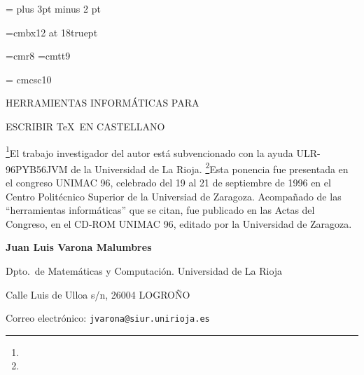 



\magnification=
\frenchspacing %
\parskip=4pt plus 3pt minus 2 pt %


\font\titulobf=cmbx12 at 18truept

\font\eightrm=cmr8
\font\eighttt=cmtt9

\font\sc = cmcsc10

\def\LaTeX{{\rm L\kern-.36em\raise.3ex\hbox{\sc a}\kern-.15em
    T\kern-.1667em\lower.7ex\hbox{E}\kern-.125emX}}



\centerline{\titulobf HERRAMIENTAS INFORM\'ATICAS PARA}
\medskip
\centerline{\titulobf ESCRIBIR \TeX\ EN CASTELLANO}
\footnote{}{{\sevenrm El trabajo investigador del autor est\'a
subvencionado con la ayuda ULR-96PYB56JVM de la Universidad de La Rioja.}}
\footnote{}{{\sevenrm Esta ponencia fue presentada en el congreso
UNIMAC 96, celebrado del 19 al 21 de septiembre de 1996 en el
Centro Polit\'ecnico Superior de la Universiad de Zaragoza.
Acompa\~nado de las ``herramientas inform\'aticas'' que se citan,
fue publicado en las Actas del Congreso, en el
CD-ROM UNIMAC 96, editado por la Universidad de Zaragoza.}}

\bigskip

\centerline{\bf Juan Luis Varona Malumbres}
\centerline{Dpto.\ de Matem\'aticas y Computaci\'on. Universidad de La Rioja}
\centerline{Calle Luis de Ulloa s/n, 26004 LOGRO\~NO}

\medskip

\centerline{Correo electr\'onico: {\tt jvarona@siur.unirioja.es}}

\bigskip

